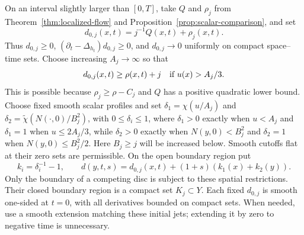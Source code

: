 On an interval slightly larger than $[0,T]$, take $Q$ and $\rho_j$ from
Theorem~\ref{thm:localized-flow} and
Proposition~\ref{prop:scalar-comparison}, and set
\begin{equation}
 d_{0,j}(x,t)=j^{-1}Q(x,t)+\rho_j(x,t).
 \label{var:base-cost}
\end{equation}
Thus $d_{0,j}\ge0$, $(\partial_t-\Delta_{h_t})d_{0,j}\ge0$, and
$d_{0,j}\to0$ uniformly on compact space--time sets.  Choose increasing
$A_j\to\infty$ so that
\begin{equation}
 d_{0,j}(x,t)\ge\rho(x,t)+j\quad\hbox{if }u(x)>A_j/3.
 \label{var:tail-wall}
\end{equation}
This is possible because $\rho_j\ge\rho-C_j$ and $Q$ has a positive
quadratic lower bound.  Choose fixed smooth scalar profiles and set
$\delta_1=\chi(u/A_j)$ and
$\delta_2=\widetilde\chi(N(\cdot,0)/B_j^2)$, with
$0\le\delta_i\le1$, where $\delta_1>0$ exactly when $u<A_j$ and
$\delta_1=1$ when $u\le2A_j/3$, while $\delta_2>0$ exactly when
$N(y,0)<B_j^2$ and $\delta_2=1$ when $N(y,0)\le B_j^2/2$.
Here $B_j\ge j$ will be increased below.  Smooth cutoffs flat at their
zero sets are permissible.  On the open boundary region put
\begin{equation}
 k_i=\delta_i^{-1}-1,\qquad
 d(y,t,s)=d_{0,j}(x,t)+(1+s)(k_1(x)+k_2(y)).
 \label{var:wall-cost}
\end{equation}
Only the boundary of a competing disc is subject to these spatial
restrictions.  Their closed boundary region is a compact set $K_j\subset Y$.
Each fixed $d_{0,j}$ is smooth one-sided at $t=0$, with all derivatives
bounded on compact sets.  When needed, use a smooth extension matching
these initial jets; extending it by zero to negative time is unnecessary.

